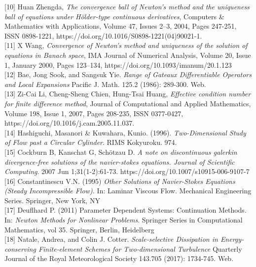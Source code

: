 \documentclass[11pt,twoside,a4paper]{article}
\begin{document}
[10] Huan Zhengda, \textit{The convergence ball of Newton's method and the uniqueness ball of equations under Hölder-type continuous derivatives},
Computers \& Mathematics with Applications,
Volume 47, Issues 2–3,
2004,
Pages 247-251,
ISSN 0898-1221,
https://doi.org/10.1016/S0898-1221(04)90021-1.\\

[11] X Wang, \textit{Convergence of Newton's method and uniqueness of the solution of equations in Banach space}, IMA Journal of Numerical Analysis, Volume 20, Issue 1, January 2000, Pages 123–134, https://doi.org/10.1093/imanum/20.1.123\\

[12] Bae, Jong Sook, and Sangsuk Yie. \textit{Range of Gateaux Differentiable Operators and Local Expansions}  Pacific J. Math. 125.2 (1986): 289-300. Web.\\

[13] Zi-Cai Li, Cheng-Sheng Chien, Hung-Tsai Huang,\textit{
Effective condition number for finite difference method},
Journal of Computational and Applied Mathematics,
Volume 198, Issue 1,
2007,
Pages 208-235,
ISSN 0377-0427,
https://doi.org/10.1016/j.cam.2005.11.037.\\

[14] Hashiguchi, Masanori \& Kuwahara, Kunio. (1996). \textit{Two-Dimensional Study of Flow past a Circular Cylinder}. RIMS Kokyuroku. 974. \\

[15] Cockburn B, Kanschat G, Schötzau D. \textit{A note on discontinuous galerkin divergence-free solutions of the navier-stokes equations. Journal of Scientific Computing}. 2007 Jun 1;31(1-2):61-73. https://doi.org/10.1007/s10915-006-9107-7\\

[16] Constantinescu V.N. (1995) \textit{Other Solutions of Navier-Stokes Equations (Steady Incompressible Flow).} In: Laminar Viscous Flow. Mechanical Engineering Series. Springer, New York, NY\\

[17] Deuflhard P. (2011) Parameter Dependent Systems: Continuation Methods. In: \textit{Newton Methods for Nonlinear Problems}. Springer Series in Computational Mathematics, vol 35. Springer, Berlin, Heidelberg\\

[18] Natale, Andrea, and Colin J. Cotter. \textit{Scale‐selective Dissipation in Energy‐conserving Finite‐element Schemes for Two‐dimensional Turbulence}  Quarterly Journal of the Royal Meteorological Society 143.705 (2017): 1734-745. Web.\\
\end{document}
